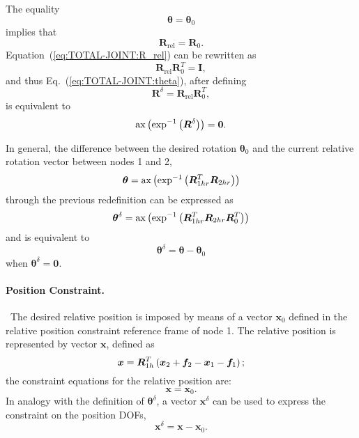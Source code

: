 \documentclass[10pt,fleqn,subeqn]{report}
\newcommand{\T}[1]{\bm{#1}}
\newcommand{\dofs}{DOFs}
\begin{document}
The equality
\begin{equation}
	\T{\theta} = \T{\theta}_0
	\label{eq:TOTAL-JOINT:theta}
\end{equation}
implies that
\begin{equation}
	\T{R}_{\mathrm{rel}} = \T{R}_0 .
	\label{eq:TOTAL-JOINT:R_rel}
\end{equation}
Equation~(\ref{eq:TOTAL-JOINT:R_rel}) can be rewritten as
\begin{equation}
	\T{R}_{\mathrm{rel}} \T{R}_0^T = \T{I} ,
\end{equation}
and thus Eq.~(\ref{eq:TOTAL-JOINT:theta}),
after defining
\begin{equation}
	\T{R}^{\delta} = \T{R}_{\text{rel}} \T{R}_0^T ,
	\label{eq:TOTAL-JOINT:R^delta}
\end{equation}
is equivalent to
\begin{equation}
	\llk{ax}\plbr{\exp^{-1}\plbr{\T{R}^{\delta}}} = \T{0} .
\end{equation}

\noindent
In general, the difference between the desired rotation
$\T{\theta}_0$ and the current relative rotation vector between
nodes 1 and 2,
\begin{equation}
	\T{\theta} = \llk{ax}\plbr{\exp^{-1}\plbr{
		\T{R}_{1hr}^T \T{R}_{2hr}
	}}
\end{equation}
through the previous redefinition can be expressed as
\begin{equation}
	\T{\theta}^{\delta} = \llk{ax}\plbr{\exp^{-1}\plbr{
		\T{R}_{1hr}^T \T{R}_{2hr} \T{R}_0^T
	}}
	\label{eq:TOTAL-JOINT:thetadelta}
\end{equation}
and is equivalent to
\begin{equation}
	\T{\theta}^{\delta} = \T{\theta} - \T{\theta}_0
\end{equation}
when $\T{\theta}^{\delta}=\T{0}$.

\paragraph{Position Constraint.} \
The desired relative position is imposed by means of a vector $\T{x}_0$
defined in the relative position constraint reference frame of node 1.
The relative position is represented by vector $\T{x}$, defined as
\begin{equation}
	\T{x} = \T{R}_{1h}^T\plbr{
		\T{x}_2 + \T{f}_2 - \T{x}_1 - \T{f}_1
	} ;
\end{equation}
the constraint equations for the relative position are:
\begin{equation}
	\T{x} = \T{x}_0 .
\end{equation}
In analogy with the definition of $\T{\theta}^{\delta}$, a vector
$\T{x}^{\delta}$ can be used to express the constraint
on the position \dofs,
\begin{equation}
	\T{x}^{\delta} = \T{x} - \T{x}_0 .
\end{equation}
\end{document}
